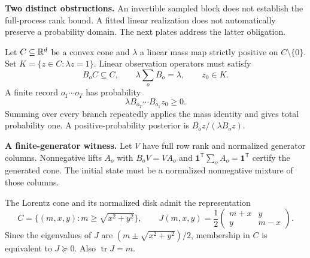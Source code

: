 \documentclass[11pt,oneside,openany]{book}
\numberwithin{equation}{section}
\begin{document}
\textbf{Two distinct obstructions.} An invertible sampled block does not establish the full-process rank bound. A fitted linear realization does not automatically preserve a probability domain. The next plates address the latter obligation.


Let $C\subseteq\mathbb R^d$ be a convex cone and $\lambda$ a linear mass map strictly positive on $C\setminus\{0\}$. Set $K=\{z\in C:\lambda z=1\}$. Linear observation operators must satisfy
\[
B_oC\subseteq C,\qquad \lambda\sum_o B_o=\lambda,\qquad z_0\in K.
\]
A finite record $o_1\cdots o_T$ has probability
\[
\lambda B_{o_T}\cdots B_{o_1}z_0\geq0.
\]
Summing over every branch repeatedly applies the mass identity and gives total probability one. A positive-probability posterior is $B_oz/(\lambda B_oz)$.

\textbf{A finite-generator witness.} Let $V$ have full row rank and normalized generator columns. Nonnegative lifts $A_o$ with $B_oV=VA_o$ and $\mathbf1^{\mathsf T}\sum_oA_o=\mathbf1^{\mathsf T}$ certify the generated cone. The initial state must be a normalized nonnegative mixture of those columns.

The Lorentz cone and its normalized disk admit the representation
\[
C=\{(m,x,y):m\geq\sqrt{x^2+y^2}\},\qquad
J(m,x,y)=\frac12\begin{pmatrix}m+x&y\\y&m-x\end{pmatrix}.
\]
Since the eigenvalues of $J$ are $(m\pm\sqrt{x^2+y^2})/2$, membership in $C$ is equivalent to $J\succeq0$. Also $\operatorname{tr}J=m$.
\end{document}
